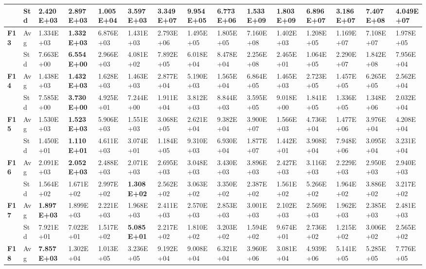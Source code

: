 \documentclass{article} %
\begin{document}
\begin{tabular}{|p{0.2in}|p{0.2in}|p{0.4in}|p{0.4in}|p{0.4in}|p{0.4in}|p{0.4in}|p{0.4in}|p{0.4in}|p{0.4in}|p{0.4in}|p{0.4in}|p{0.4in}|p{0.4in}|p{0.4in}|}
\textbf{} & Std & \textbf{2.420E+03} & 2.897E+03 & 1.005E+04 & 3.597E+03 & 3.349E+07 & 9.954E+05 & 6.773E+06 & 1.533E+09 & 1.803E+09 & 6.896E+07 & 3.186E+07 & 7.407E+08 & 4.049E+07 \\ \hline 
\textbf{F13} & Avg & 1.334E+03 & \textbf{1.332E+03} & 6.876E+03 & 1.431E+03 & 2.793E+06 & 1.495E+05 & 1.805E+05 & 7.160E+08 & 1.402E+03 & 1.208E+05 & 1.169E+07 & 7.108E+07 & 1.978E+05 \\ \hline 
\textbf{} & Std & 7.663E+00 & \textbf{6.554E+00} & 2.966E+03 & 4.081E+02 & 7.892E+05 & 6.018E+04 & 8.478E+04 & 2.256E+08 & 2.465E+01 & 1.064E+05 & 2.290E+07 & 1.842E+08 & 7.956E+04 \\ \hline 
\textbf{F14} & Avg & 1.438E+03 & \textbf{1.432E+03} & 1.628E+03 & 1.463E+03 & 2.877E+04 & 5.190E+03 & 1.565E+04 & 6.864E+05 & 1.465E+03 & 2.723E+05 & 1.457E+05 & 6.265E+05 & 2.562E+04 \\ \hline 
\textbf{} & Std & 7.585E+00 & \textbf{3.730E+00} & 4.925E+01 & 7.244E+00 & 1.911E+04 & 3.812E+03 & 8.844E+03 & 3.595E+05 & 9.018E+00 & 1.841E+05 & 1.336E+05 & 1.348E+06 & 2.032E+04 \\ \hline 
\textbf{F15} & Avg & 1.530E+03 & \textbf{1.523E+03} & 5.906E+03 & 1.551E+03 & 3.068E+05 & 2.621E+04 & 9.382E+04 & 3.900E+07 & 1.566E+03 & 4.736E+04 & 1.477E+06 & 3.976E+04 & 4.208E+04 \\ \hline 
\textbf{} & Std & 1.450E+01 & \textbf{1.110E+01} & 4.611E+03 & 3.074E+01 & 1.184E+05 & 9.310E+03 & 6.930E+04 & 1.877E+07 & 1.442E+01 & 3.908E+04 & 7.948E+06 & 3.095E+04 & 3.231E+04 \\ \hline 
\textbf{F16} & Avg & 2.091E+03 & \textbf{2.052E+03} & 2.488E+03 & 2.071E+03 & 2.695E+03 & 3.048E+03 & 3.430E+03 & 3.896E+03 & 2.427E+03 & 3.116E+03 & 2.229E+03 & 2.950E+03 & 2.940E+03 \\ \hline 
\textbf{} & Std & 1.564E+02 & 1.671E+02 & 2.997E+02 & \textbf{1.308E+02} & 2.562E+02 & 3.063E+02 & 3.350E+02 & 2.387E+02 & 1.561E+02 & 5.266E+02 & 1.964E+02 & 3.886E+02 & 3.217E+02 \\ \hline 
\textbf{F17} & Avg & \textbf{1.897E+03} & 1.899E+03 & 2.221E+03 & 1.968E+03 & 2.411E+03 & 2.570E+03 & 2.853E+03 & 3.001E+03 & 2.102E+03 & 2.569E+03 & 1.962E+03 & 2.385E+03 & 2.481E+03 \\ \hline 
\textbf{} & Std & 7.921E+01 & 7.022E+01 & 1.517E+02 & \textbf{5.085E+01} & 2.217E+02 & 1.810E+02 & 3.203E+02 & 1.594E+02 & 9.674E+01 & 2.736E+02 & 1.215E+02 & 3.006E+02 & 2.565E+02 \\ \hline 
\textbf{F18} & Avg & \textbf{7.857E+03} & 1.302E+04 & 1.013E+05 & 3.236E+05 & 9.192E+04 & 9.008E+04 & 6.321E+04 & 3.960E+06 & 3.081E+04 & 4.939E+06 & 5.141E+05 & 5.285E+05 & 7.776E+05 \\ \hline 

\end{tabular}
\end{document}
